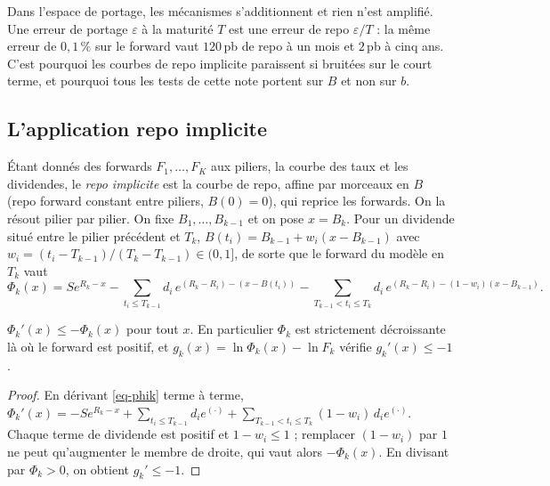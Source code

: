 \begin{insight}
Dans l'espace de portage, les mécanismes s'additionnent et rien n'est amplifié. Une erreur de portage $\varepsilon$
à la maturité $T$ est une erreur de repo $\varepsilon/T$ : la même erreur de $0{,}1\,\%$ sur le forward vaut $120$\,pb de
repo à un mois et $2$\,pb à cinq ans. C'est pourquoi les courbes de repo implicite paraissent si bruitées sur le court
terme, et pourquoi tous les tests de cette note portent sur $B$ et non sur $b$.
\end{insight}

\subsection{L'application repo implicite}
Étant donnés des forwards $F_1,\dots,F_K$ aux piliers, la courbe des taux et les dividendes, le \emph{repo implicite}
est la courbe de repo, affine par morceaux en $B$ (repo forward constant entre piliers, $B(0)=0$), qui reprice les
forwards. On la résout pilier par pilier. On fixe $B_1,\dots,B_{k-1}$ et on pose $x=B_k$. Pour un dividende situé entre
le pilier précédent et $T_k$, $B(t_i)=B_{k-1}+w_i(x-B_{k-1})$ avec $w_i=(t_i-T_{k-1})/(T_k-T_{k-1})\in(0,1]$, de sorte que
le forward du modèle en $T_k$ vaut
\begin{equation}\label{eq-phik}
\Phi_k(x)=Se^{R_k-x}-\sum_{t_i\le T_{k-1}}d_i\,e^{(R_k-R_i)-(x-B(t_i))}
-\sum_{T_{k-1}<t_i\le T_k}d_i\,e^{(R_k-R_i)-(1-w_i)(x-B_{k-1})}.
\end{equation}

\begin{lemma}[Monotonie]\label{lem-monotone}
$\Phi_k'(x)\le-\Phi_k(x)$ pour tout $x$. En particulier $\Phi_k$ est strictement décroissante là où le forward est
positif, et $g_k(x)=\ln\Phi_k(x)-\ln F_k$ vérifie $g_k'(x)\le-1$.
\end{lemma}
\begin{proof}
En dérivant \cref{eq-phik} terme à terme,
$\Phi_k'(x)=-Se^{R_k-x}+\sum_{t_i\le T_{k-1}}d_ie^{(\cdot)}+\sum_{T_{k-1}<t_i\le T_k}(1-w_i)\,d_ie^{(\cdot)}$.
Chaque terme de dividende est positif et $1-w_i\le1$ ; remplacer $(1-w_i)$ par $1$ ne peut qu'augmenter le membre de
droite, qui vaut alors $-\Phi_k(x)$. En divisant par $\Phi_k>0$, on obtient $g_k'\le-1$.
\end{proof}

